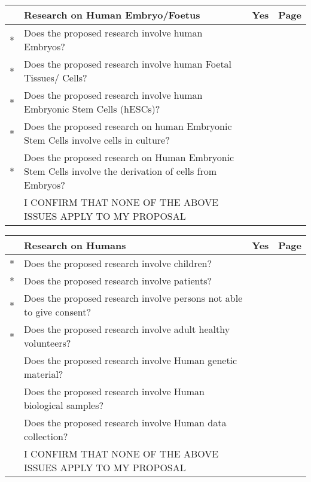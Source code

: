 \documentclass[11pt]{ltxdoc}
\begin{document}
\vspace{0.5cm}
\begin{tabularx}{\linewidth}{ | c | X | c | c | }
\rowcolor{black} & {\centering\arraybackslash \color{white} \bf Research on Human Embryo/Foetus} & {\color{white} \bf Yes} & {\color{white} \bf Page} \\ \hline
 * & Does the proposed research involve human Embryos?                                                      & & \\ \hline
 * & Does the proposed research involve human Foetal Tissues/ Cells?                                        & & \\ \hline
 * & Does the proposed research involve human Embryonic Stem Cells (hESCs)?                                 & & \\ \hline
 * & Does the proposed research on human Embryonic Stem Cells involve cells in culture?                     & & \\ \hline
 * & Does the proposed research on Human Embryonic Stem Cells involve the derivation of cells from Embryos? & & \\ \hline
   & I CONFIRM THAT NONE OF THE ABOVE ISSUES APPLY TO MY PROPOSAL                                           & & \cellcolor[gray]{0.8}\\ \hline 
\end{tabularx}

\vspace{0.5cm}
\begin{tabularx}{\linewidth}{ | c | X | c | c | }
\rowcolor{black} & {\centering\arraybackslash \color{white} \bf Research on Humans} & {\color{white} \bf Yes} & {\color{white} \bf Page} \\ \hline
 * & Does the proposed research involve children?                         & & \\ \hline
 * & Does the proposed research involve patients?                         & & \\ \hline
 * & Does the proposed research involve persons not able to give consent? & & \\ \hline
 * & Does the proposed research involve adult healthy volunteers?         & & \\ \hline
   & Does the proposed research involve Human genetic material?           & & \\ \hline
   & Does the proposed research involve Human biological samples?         & & \\ \hline
   & Does the proposed research involve Human data collection?            & & \\ \hline
   & I CONFIRM THAT NONE OF THE ABOVE ISSUES APPLY TO MY PROPOSAL         & & \cellcolor[gray]{0.8}\\ \hline 
\end{tabularx}
\end{document}
